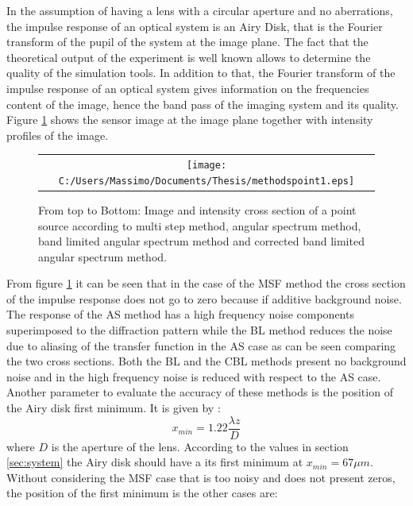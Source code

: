 	In the assumption of having a lens with a circular aperture and no aberrations, the impulse response of an optical system is an Airy Disk, that is the Fourier transform of the pupil of the system at the image plane. The fact that the theoretical output of the experiment is well known allows to determine the quality of the simulation tools.
	In addition to that, the Fourier transform of the impulse response of an optical system gives information on the frequencies content of the image, hence the band pass of the imaging system and its quality. 
	Figure \ref{fig:resultspoint11} shows the sensor image at the image plane together with intensity profiles of the image.
	\newpage
	 \begin{figure}[H]
	 	\begin{center}
	 		\begin{tabular}{c}
	 			\texttt{[image: C:/Users/Massimo/Documents/Thesis/methodspoint1.eps]}
	 		\end{tabular}
	 	\end{center}
	 	\caption{ \label{fig:resultspoint11} 
	 		From top to Bottom: Image and intensity cross section of a point source according to multi step method, angular spectrum method, band limited angular spectrum method and corrected band limited angular spectrum method. }
	 \end{figure} 
	From figure \ref{fig:resultspoint11} it can be seen that in the case of the MSF method the cross section of the impulse response does not go to zero because if additive background noise. The response of the AS method has a high frequency noise components superimposed to the diffraction pattern while the BL method reduces the noise due to aliasing of the transfer function in the AS case as can be seen comparing the two cross sections. Both the BL and the CBL methods present no background noise and in the high frequency noise is reduced with respect to the AS case. Another parameter to evaluate the accuracy of these methods is the position of the Airy disk first minimum. It is given by \cite{goodman2005introduction,pedrotti1993introduction}:
	 \begin{equation}
	 \label{eq:airy}
	 x_{min}=1.22\dfrac{\lambda z}{D}
	 \end{equation}
	 where $D$ is the aperture of the lens. According to the values in section \ref{sec:system} the Airy disk should have a its first minimum at $x_{min}=67 \mu m$.
	 Without considering the MSF case that is too noisy and does not present zeros, the position of the first minimum is the other cases are:\\
